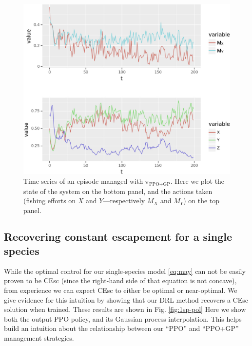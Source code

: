 \documentclass{article}
\begin{document}
\begin{figure}
  \centering
  \includegraphics[scale=0.33]{figures/timeseries-gpp.jpeg}
  \caption{Time-series of an episode managed with $\pi_{\text{PPO+GP}}$. Here we plot the state of the system on the bottom panel, and the actions taken (fishing efforts on $X$ and $Y$---respectively $M_X$ and $M_Y$) on the top panel.}
  \label{fig:gpp-ep}
\end{figure}

\hypertarget{recovering-constant-escapement-for-a-single-species}{%
\subsection{Recovering constant escapement for a single
species}\label{recovering-constant-escapement-for-a-single-species}}

While the optimal control for our single-species model \eqref{eq:may}
can not be easily proven to be CEsc (since the right-hand side of that
equation is not concave), from experience we can expect CEsc to either
be optimal or near-optimal. We give evidence for this intuition by
showing that our DRL method recovers a CEsc solution when trained. These
results are shown in Fig. \ref{fig:1sp-pol} Here we show both the output
PPO policy, and its Gaussian process interpolation. This helps build an
intuition about the relationship between our ``PPO'' and ``PPO+GP''
management strategies.
\end{document}
